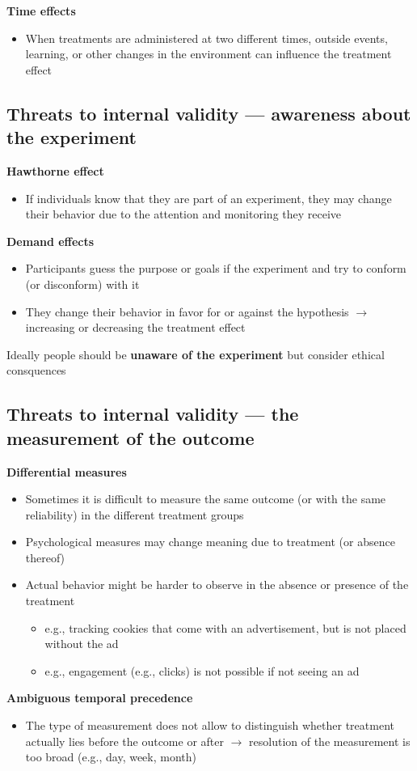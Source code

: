\documentclass[10pt]{article}
\begin{document}
\textbf{Time effects}
\begin{itemize}
    \item When treatments are administered at two different times, outside events, learning, or other changes in the environment can influence the treatment effect 
\end{itemize}
\subsection{Threats to internal validity --- awareness about the experiment}
\textbf{Hawthorne effect}
\begin{itemize}
    \item If individuals know that they are part of an experiment, they may change their behavior due to the attention and monitoring they receive 
\end{itemize}
\textbf{Demand effects}
\begin{itemize}
    \item Participants guess the purpose or goals if the experiment and try to conform (or disconform) with it 
    \item They change their behavior in favor for or against the hypothesis $\to $ increasing or decreasing the treatment effect 
\end{itemize}

Ideally people should be \textbf{unaware of the experiment} but consider ethical consquences 

\subsection{Threats to internal validity --- the measurement of the outcome}
\textbf{Differential measures}
\begin{itemize}
    \item Sometimes it is difficult to measure the same outcome (or with the same reliability) in the different treatment groups 
    \item Psychological measures may change meaning due to treatment (or absence thereof)
    \item Actual behavior might be harder to observe in the absence or presence of the treatment
    \begin{itemize}
        \item e.g., tracking cookies that come with an advertisement, but is not placed without the ad 
        \item e.g., engagement (e.g., clicks) is not possible if not seeing an ad 
    \end{itemize}
\end{itemize}

\textbf{Ambiguous temporal precedence}
\begin{itemize}
    \item The type of measurement does not allow to distinguish whether treatment actually lies before the outcome or after $\to $ resolution of the measurement is too broad (e.g., day, week, month)
\end{itemize}
\end{document}
